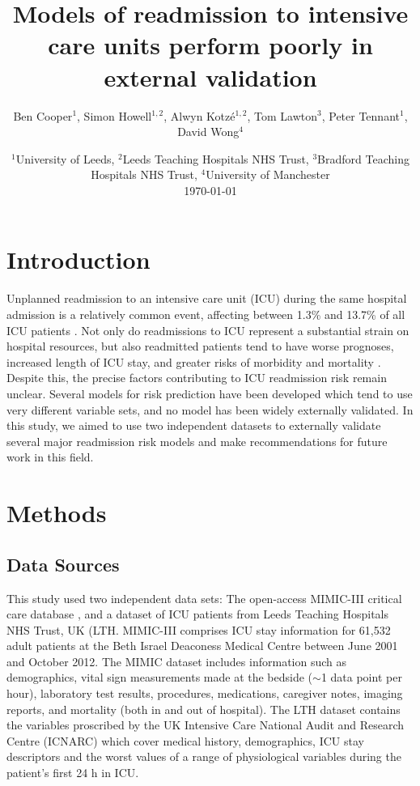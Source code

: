 \documentclass[onecolumn]{article}
\title{Models of readmission to intensive care units perform poorly in external validation}
\author{Ben Cooper$^1$, Simon Howell$^{1,2}$, Alwyn Kotzé$^{1,2}$, Tom Lawton$^3$, Peter Tennant$^1$, David Wong$^4$}
\date{%
    $^1$University of Leeds, $^2$Leeds Teaching Hospitals NHS Trust, $^3$Bradford Teaching Hospitals NHS Trust, $^4$University of Manchester\\[2ex]%
    \today
}
\begin{document}
\maketitle

\section{Introduction}

Unplanned readmission to an intensive care unit (ICU) during the same hospital admission is a relatively common event, affecting between 1.3\% and 13.7\% of all ICU patients \citep{Elliott2014}. Not only do readmissions to ICU represent a substantial strain on hospital resources, but also readmitted patients tend to have worse prognoses, increased length of ICU stay, and greater risks of morbidity and mortality \citep{MarkaziMoghaddam2020}. Despite this, the precise factors contributing to ICU readmission risk remain unclear. Several models for risk prediction have been developed which tend to use very different variable sets, and no model has been widely externally validated. In this study, we aimed to use two independent datasets to externally validate several major readmission risk models and make recommendations for future work in this field.

\section{Methods}

\subsection{Data Sources}

This study used two independent data sets: The open-access MIMIC-III critical care database \citep{Johnson2016}, and a dataset of ICU patients  from Leeds Teaching Hospitals NHS Trust, UK (LTH. MIMIC-III  comprises ICU stay information for 61,532 adult patients at the Beth Israel Deaconess Medical Centre between June 2001 and October 2012. The MIMIC dataset includes information such as demographics, vital sign measurements made at the bedside ($\sim$1 data point per hour), laboratory test results, procedures, medications, caregiver notes, imaging reports, and mortality (both in and out of hospital). The LTH dataset contains the variables proscribed by the UK Intensive Care National Audit and Research Centre (ICNARC) which cover medical history, demographics, ICU stay descriptors and the worst values of a range of physiological variables during the patient's first 24 h in ICU.
\end{document}
